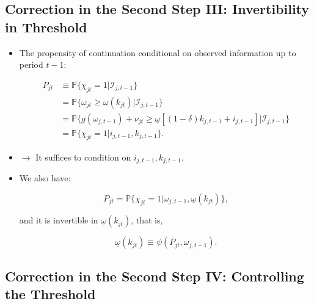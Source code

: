 \documentclass[]{book}
\providecommand{\tightlist}{%
  \setlength{\itemsep}{0pt}\setlength{\parskip}{0pt}}
\begin{document}
\subsection{Correction in the Second Step III: Invertibility in
Threshold}\label{correction-in-the-second-step-iii-invertibility-in-threshold}

\begin{itemize}
\tightlist
\item
  The propensity of continuation conditional on observed information up
  to period \(t - 1\):

  \begin{equation}
  \begin{split}
  P_{jt} &\equiv \mathbb{P}\{\chi_{jt} = 1|\mathcal{I}_{j, t - 1}\}\\
  &= \mathbb{P}\{\omega_{jt} \ge \underline{\omega}(k_{jt}) |\mathcal{I}_{j, t - 1}\}\\
  &= \mathbb{P}\{g(\omega_{j, t - 1}) + \nu_{jt} \ge \underline{\omega}[(1 - \delta) k_{j, t - 1} + i_{j, t - 1}]|\mathcal{I}_{j, t - 1} \}\\
  &= \mathbb{P}\{ \chi_{jt} = 1| i_{j, t - 1}, k_{j, t - 1}\}.
  \end{split}
  \end{equation}
\item
  \(\rightarrow\) It suffices to condition on
  \(i_{j, t - 1}, k_{j, t - 1}\).
\item
  We also have:

  \begin{equation}
  P_{jt} = \mathbb{P}\{\chi_{jt} = 1| \omega_{j, t - 1}, \underline{\omega}(k_{jt})\},
  \end{equation}

  and it is invertible in \(\underline{\omega}(k_{jt})\), that is,

  \begin{equation}
  \underline{\omega}(k_{jt}) \equiv \psi(P_{jt}, \omega_{j, t - 1}).
  \end{equation}
\end{itemize}

\subsection{Correction in the Second Step IV: Controlling the
Threshold}\label{correction-in-the-second-step-iv-controlling-the-threshold}
\end{document}
